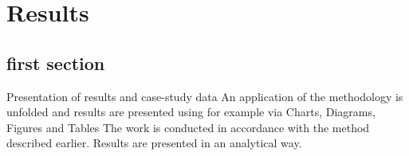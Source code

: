 \chapter{Results} \label{ch:results}



\section{first section} \label{sec:sectionlabel}

Presentation of results and case-study data 
An application of the methodology is unfolded and results are presented using for example via Charts, Diagrams, Figures and Tables 
The work is conducted in accordance with the method described earlier. Results are presented in an analytical way.